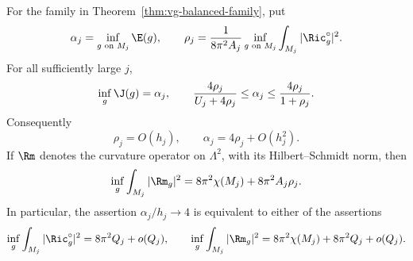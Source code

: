 \begin{theorem}
\label{thm:vg-first-order-reduction}
For the family in Theorem~\ref{thm:vg-balanced-family}, put
\begin{equation}\label{eq:vg-alpha-rho}
 \alpha_j=\inf_{g\text{ on }M_j}\E(g),\qquad
 \rho_j=\frac{1}{8\pi^2A_j}
                    \inf_{g\text{ on }M_j}\int_{M_j}|\Ric_g^\circ|^2.
\end{equation}
For all sufficiently large $j$,
\begin{equation}\label{eq:vg-rho-bounds}
 \inf_g\J(g)=\alpha_j,\qquad
 \frac{4\rho_j}{U_j+4\rho_j}
                  \leq\alpha_j\leq\frac{4\rho_j}{1+\rho_j}.
\end{equation}
Consequently
\begin{equation}\label{eq:vg-alpha-four-rho}
 \rho_j=O(h_j),\qquad \alpha_j=4\rho_j+O(h_j^2).
\end{equation}
If $\Rm$ denotes the curvature operator on $\Lambda^2$, with its
Hilbert--Schmidt norm, then
\begin{equation}\label{eq:vg-full-curvature-infimum}
 \inf_g\int_{M_j}|\Rm_g|^2
      =8\pi^2\chi(M_j)+8\pi^2A_j\rho_j.
\end{equation}
In particular, the assertion $\alpha_j/h_j\to4$ is equivalent to either
of the assertions
\begin{equation}\label{eq:vg-open-equivalences}
 \inf_g\int_{M_j}|\Ric_g^\circ|^2
          =8\pi^2Q_j+o(Q_j),\qquad
 \inf_g\int_{M_j}|\Rm_g|^2
          =8\pi^2\chi(M_j)+8\pi^2Q_j+o(Q_j).
\end{equation}
\end{theorem}

